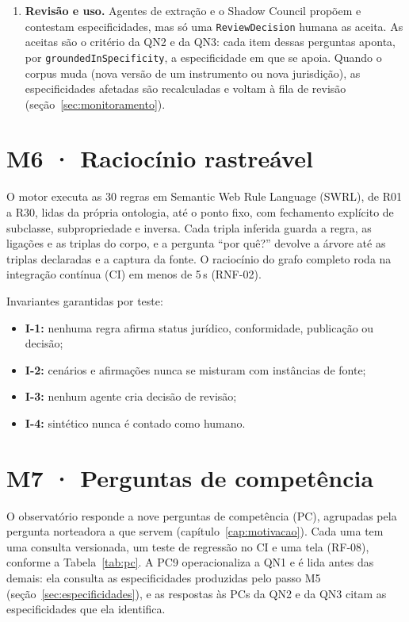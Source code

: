 \documentclass[12pt,a4paper,oneside,english,brazil]{abntex2}
\newcommand{\rf}[1]{{\footnotesize(#1)}}
\begin{document}
\begin{enumerate}[leftmargin=*]
  \item \textbf{Revisão e uso.} Agentes de extração e o Shadow Council propõem e contestam especificidades, mas só uma \texttt{ReviewDecision} humana as aceita. As aceitas são o critério da QN2 e da QN3: cada item dessas perguntas aponta, por \texttt{groundedInSpecificity}, a especificidade em que se apoia. Quando o corpus muda (nova versão de um instrumento ou nova jurisdição), as especificidades afetadas são recalculadas e voltam à fila de revisão (seção~\ref{sec:monitoramento}).
\end{enumerate}

\section{M6 · Raciocínio rastreável}
O motor executa as 30 regras em Semantic Web Rule Language (SWRL), de R01 a R30, lidas da própria ontologia, até o ponto fixo, com fechamento explícito de subclasse, subpropriedade e inversa. Cada tripla inferida guarda a regra, as ligações e as triplas do corpo, e a pergunta ``por quê?'' devolve a árvore até as triplas declaradas e a captura da fonte. O raciocínio do grafo completo roda na integração contínua (CI) em menos de 5\,s \rf{RNF-02}.

Invariantes garantidas por teste:
\begin{itemize}[leftmargin=*]
  \item \textbf{I-1:} nenhuma regra afirma status jurídico, conformidade, publicação ou decisão;
  \item \textbf{I-2:} cenários e afirmações nunca se misturam com instâncias de fonte;
  \item \textbf{I-3:} nenhum agente cria decisão de revisão;
  \item \textbf{I-4:} sintético nunca é contado como humano.
\end{itemize}

\section{M7 · Perguntas de competência}\label{sec:pc}
O observatório responde a nove perguntas de competência (PC), agrupadas pela pergunta norteadora a que servem (capítulo~\ref{cap:motivacao}). Cada uma tem uma consulta versionada, um teste de regressão no CI e uma tela \rf{RF-08}, conforme a Tabela~\ref{tab:pc}. A PC9 operacionaliza a QN1 e é lida antes das demais: ela consulta as especificidades produzidas pelo passo M5 (seção~\ref{sec:especificidades}), e as respostas às PCs da QN2 e da QN3 citam as especificidades que ela identifica.
\end{document}
